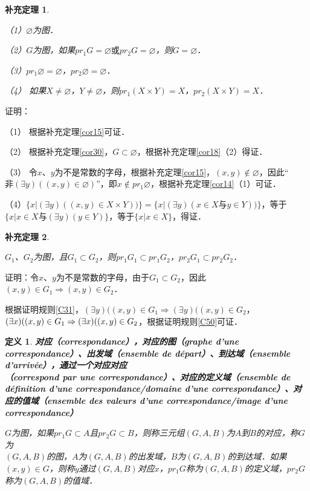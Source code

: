 \documentclass[12pt, a4paper, oneside]{book}
\newtheorem{cor}{补充定理}
\newtheorem{de}{定义}
\begin{document}
			\begin{cor}\label{cor31}
				\hfill\par
				（1）$\varnothing$为图．
				\par
				（2）$G$为图，如果$pr_1G= \varnothing\text{或}pr_2G=\varnothing$，则$G=\varnothing$．
				\par
				（3）$pr_1\varnothing = \varnothing$，$pr_2\varnothing =\varnothing$．
				\par
				（4）	如果$X\neq \varnothing$，$Y\neq \varnothing$，则$pr_1(X\times Y)=X$，$pr_2(X\times Y)=X$．
			\end{cor}
			证明：
			\par
			（1）	根据补充定理\ref{cor15}可证．
			\par
			（2）	根据补充定理\ref{cor30}，$G\subset \varnothing$，根据补充定理\ref{cor18}（2）得证．
			\par
			（3）	令$x$、$y$为不是常数的字母，根据补充定理\ref{cor15}，$(x, y)\notin \varnothing$，因此“$\text{非}(\exists y)((x, y)\in \varnothing)$”，即$x\notin pr_1\varnothing$，根据补充定理\ref{cor14}（1）可证．
			\par
			（4）$\{x|(\exists y)((x, y)\in X\times Y))\}=\{x|(\exists y)(x\in X\text{与}y\in Y))\}$，等于$\{x|x\in X\text{与}(\exists y)(y\in Y)\}$，等于$\{x|x\in X\}$，得证．	
			
			\begin{cor}\label{cor32}
				\hfill\par
				$G_1$、$G_2$为图，且$G_1\subset G_2$，则p$r_1G_1\subset pr_1G_2$，$pr_2G_1\subset pr_2G_2$．
			\end{cor}
			证明：令$x$、$y$为不是常数的字母，由于$G_1\subset G_2$，因此$(x, y)\in G_1\Rightarrow (x, y)\in G_2$．
			\par
			根据证明规则\ref{C31}，$(\exists y)((x, y)\in G_1\Rightarrow (\exists y)((x, y)\in G_2$，$(\exists x)((x, y)\in G_1\Rightarrow (\exists x)((x, y)\\\in G_2$，根据证明规则\ref{C50}可证．				

			\begin{de}
				\textbf{对应（correspondance），对应的图（graphe d'une correspondance）、出发域（ensemble de départ）、到达域（ensemble d'arrivée），通过一个对应对应\\（correspond par une correspondance）、对应的定义域（ensemble de définition d'une correspondance/domaine d'une correspondance）、对应的值域（ensemble des valeurs d'une correspondance/image d'une correspondance）}
				\par
				$G$为图，如果$pr_1G\subset A$且$pr_2G\subset B$，则称三元组$(G, A, B)$为$A$到$B$的对应，称$G$为\\$(G, A, B)$的图，$A$为$(G, A, B)$的出发域，$B$为$(G, A, B)$的到达域．如果$(x, y)\in G$，则称$y$通过$(G, A, B)$对应$x$，$pr_1G$称为$(G, A, B)$的定义域，$pr_2G$称为$(G, A, B)$的值域．
			\end{de}
\end{document}
